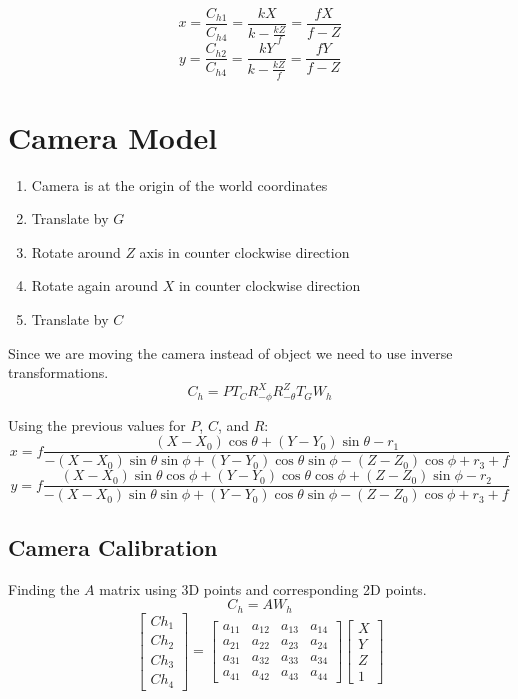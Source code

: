 \documentclass{article}
\begin{document}
\[x=\frac{C_{h1}}{C_{h4}}=\frac{kX}{k-\frac{kZ}{f}}=\frac{fX}{f-Z}\]
\[y=\frac{C_{h2}}{C_{h4}}=\frac{kY}{k-\frac{kZ}{f}}=\frac{fY}{f-Z}\]

\section*{Camera Model}
\begin{enumerate}
    \item Camera is at the origin of the world coordinates
    \item Translate by $G$
    \item Rotate around $Z$ axis in counter clockwise direction
    \item Rotate again around $X$ in counter clockwise direction
    \item Translate by $C$
\end{enumerate}
Since we are moving the camera instead of object we need to use inverse transformations.
\[C_h=P T_C R_{-\phi}^X R_{-\theta}^Z T_G W_h\]

Using the previous values for $P$, $C$, and $R$:
\[x=f\frac{(X-X_0)\cos\theta + (Y-Y_0)\sin\theta - r_1}{-(X-X_0)\sin\theta\sin\phi + (Y-Y_0)\cos\theta\sin\phi - (Z-Z_0)\cos\phi + r_3 + f}\]
\[y=f\frac{(X-X_0)\sin\theta\cos\phi + (Y-Y_0)\cos\theta\cos\phi + (Z-Z_0)\sin\phi - r_2}{-(X-X_0)\sin\theta\sin\phi + (Y-Y_0)\cos\theta\sin\phi - (Z-Z_0)\cos\phi + r_3 + f}\]

\subsection*{Camera Calibration}

Finding the $A$ matrix using 3D points and corresponding 2D points.
\[C_h=AW_h\]
\[\begin{bmatrix}
    Ch_1 \\ Ch_2 \\ Ch_3 \\ Ch_4
\end{bmatrix} = \begin{bmatrix}
    a_{11} & a_{12} & a_{13} & a_{14} \\
    a_{21} & a_{22} & a_{23} & a_{24} \\
    a_{31} & a_{32} & a_{33} & a_{34} \\
    a_{41} & a_{42} & a_{43} & a_{44}
\end{bmatrix}\begin{bmatrix}
    X \\ Y \\ Z \\ 1
\end{bmatrix}\]
\end{document}
